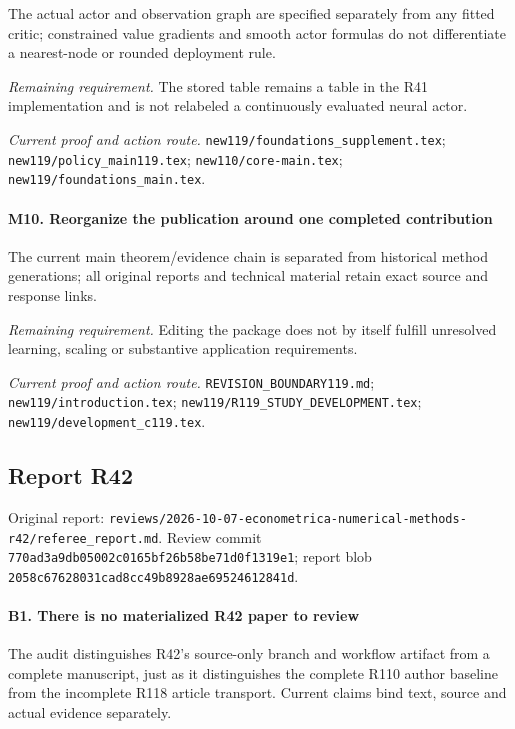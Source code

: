 The actual actor and observation graph are specified separately from any fitted critic; constrained value gradients and smooth actor formulas do not differentiate a nearest-node or rounded deployment rule.

\par\emph{Remaining requirement.} The stored table remains a table in the R41 implementation and is not relabeled a continuously evaluated neural actor.

\par\emph{Current proof and action route.} \nolinkurl{new119/foundations_supplement.tex}; \nolinkurl{new119/policy_main119.tex}; \nolinkurl{new110/core-main.tex}; \nolinkurl{new119/foundations_main.tex}.

\paragraph{M10. Reorganize the publication around one completed contribution}

The current main theorem/\allowbreak{}evidence chain is separated from historical method generations; all original reports and technical material retain exact source and response links.

\par\emph{Remaining requirement.} Editing the package does not by itself fulfill unresolved learning, scaling or substantive application requirements.

\par\emph{Current proof and action route.} \nolinkurl{REVISION_BOUNDARY119.md}; \nolinkurl{new119/introduction.tex}; \nolinkurl{new119/R119_STUDY_DEVELOPMENT.tex}; \nolinkurl{new119/development_c119.tex}.

\subsection{Report R42}

Original report: \nolinkurl{reviews/2026-10-07-econometrica-numerical-methods-r42/referee_report.md}. Review commit \nolinkurl{770ad3a9db05002c0165bf26b58be71d0f1319e1}; report blob \nolinkurl{2058c67628031cad8cc49b8928ae69524612841d}.

\paragraph{B1. There is no materialized R42 paper to review}

The audit distinguishes R42's source-only branch and workflow artifact from a complete manuscript, just as it distinguishes the complete R110 author baseline from the incomplete R118 article transport. Current claims bind text, source and actual evidence separately.

